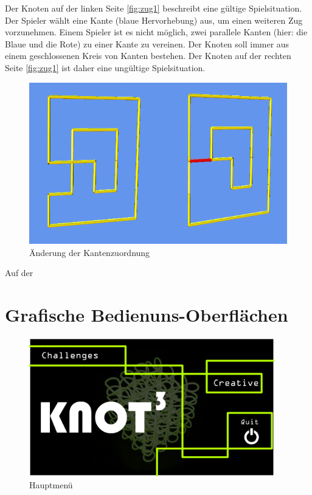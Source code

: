 Der Knoten auf der linken Seite \ref{fig:zug1} beschreibt eine gültige Spielsituation. Der Spieler wählt eine Kante (blaue Hervorhebung) aus, um einen weiteren Zug vorzunehmen.
Einem Spieler ist es nicht möglich, zwei parallele Kanten (hier: die Blaue und die Rote) zu einer Kante zu vereinen. Der Knoten soll immer aus einem geschlossenen Kreis von Kanten bestehen. Der Knoten auf der rechten Seite \ref{fig:zug1} ist daher eine ungültige Spielsituation.

\clearpage

	\begin{figure}[htb]
	  \centering
	  \includegraphics[width = \textwidth]{Systemmodelle/Ungueltiger_Zug2.png}
	  \caption{{\color{red}Änderung der Kantenzuordnung}}
	  \label{fig:zug2}
	\end{figure}
	
Auf der 

\clearpage

\section{Grafische Bedienuns-Oberflächen}

	\begin{figure}[ht]
	  \centering
	  \includegraphics[width = 0.95\textwidth]{Systemmodelle/01_Knot3-mainscreen.png}
	  \caption{Hauptmenü}
	\end{figure}

